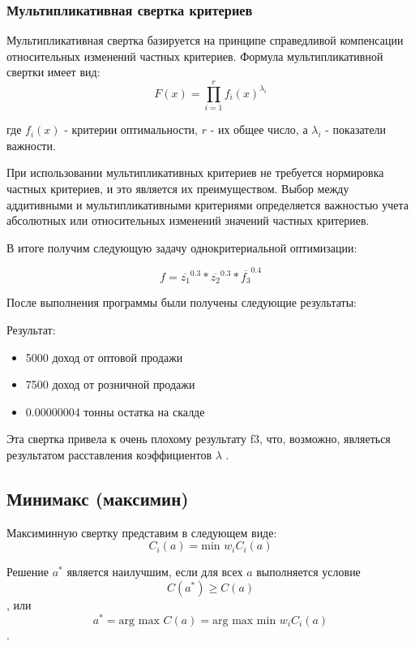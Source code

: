 \documentclass[14pt,a4paper,report]{report}
\begin{document}
\subsubsection{Мультипликативная свертка критериев}
Мультипликативная свертка базируется на принципе справедливой компенсации относительных изменений частных критериев. Формула мультипликативной свертки имеет вид:
\begin{equation}
F(x) = \prod_{i=1}^{r}f_i(x)^{\lambda_i}
\end{equation}


где $f_i(x)$ - критерии оптимальности, $r$ - их общее число, а $\lambda_i$ - показатели важности. 

При использовании мультипликативных критериев не требуется нормировка частных критериев, и это является их преимуществом. Выбор между аддитивными и мультипликативными критериями определяется важностью учета абсолютных или относительных изменений значений частных критериев.

В итоге получим следующую задачу однокритериальной оптимизации:

\begin{equation}
f = \overline{z_1}^{0.3}*\overline{z_2}^{0.3}*\overline{f_3}^{0.4}
\end{equation}



После выполнения программы были получены следующие результаты:



Результат:
\begin{itemize}
\item 5000 доход от оптовой продажи
\item 7500 доход от розничной продажи
\item 0.00000004 тонны остатка на скалде
\end{itemize}

Эта свертка привела к очень плохому результату f3, что, возможно, являеться результатом расставления коэффициентов $\lambda$ .





\subsection{Минимакс (максимин)}
Максиминную свертку представим в следующем виде: $$ C_i(a)= \text{min } w_i C_i(a) $$

Решение $a^*$ является наилучшим, если для всех $a$ выполняется условие $$C(a^*) \geq C(a) $$, или $$ a^* = \text{arg max } C(a) = \text{arg max min } w_i C_i (a) $$ .
\end{document}
